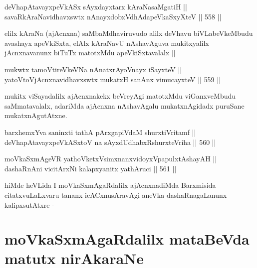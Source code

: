\begin{shl}
deVhapAtavayxpeVkASx sAyxdayxtarx kAraNasaMgatiH || \\
savaRkAraNavidhavxswtx nAnayxdobxVdhAdapeVkaSxyXteV ||  558 ||  
\end{shl}

\begin{artha}
elilx kAraNa (ajAcnxna) saMbaMdhaviruvudo alilx deVhavu
biVLabeVkeMbudu avashayx apeVkiSxta, elAlx kAraNavU nAshavAguva
mukitxyalilx jAcnxnavanunx biTuTx matotxMdu apeVkiSxtavalalx || 
\end{artha}

\begin{shl}
mukwtx tamoVtireVkeVNa nAnatxrAyoV\s nayx iSayxteV || \\
yatoV\s toV\s jAcnxnavidhavxswtx mukatxH sanAnx vimucayxteV ||  559 ||  
\end{shl}

\begin{artha}
mukitx viSayadalilx ajAcnxnakekx beVreyAgi matotxMdu viGanxveMbudu
saMmatavalalx, adariMda ajAcnxna nAshavAgalu mukatxnAgidadx puruSane mukatxnAgutAtxne.
\end{artha}

\begin{shl}
barxhemxYva saninxti tathA pArxgapiVdaM shurxtiVritamf || \\
deVhapAtavayxpeVkASx\s toV na sAyxdUdhabxRshurxteVriha ||  560 ||  
\end{shl}





\begin{shl}
moVkaSxmAgeVR yathoVketxV\s simxnanxvidoyxVpapulxtAshayAH || \\
dashaRnAni vicitArxNi kalapxyanitx yathAruci ||  561 ||  
\end{shl}

\begin{artha}
hiMde heVLida I moVkaSxmAgaRdalilx ajAcnxnadiMda Barxmisida
citatxvuLaLxvaru tananx icACxnusAravAgi aneVka dashaRnagaLanunx
kalipxsutAtxre -
\end{artha}

\section*{moVkaSxmAgaRdalilx mataBeVda matutx nirAkaraNe}


